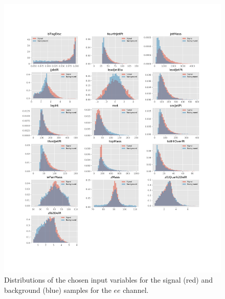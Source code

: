 \begin{figure}[htb]
\centering
\vspace*{-3.25cm}\hspace*{-2.3cm}\includegraphics[width=1.27\textwidth]{figs/background-estimation/plots/vars_ee_corrected.pdf}
\vspace*{-1cm}\caption{
Distributions of the chosen input variables for the signal (red) and background (blue) samples for the $ee$ channel.}
\label{fig:inputFeaturesDistributions_ee}
\end{figure}

